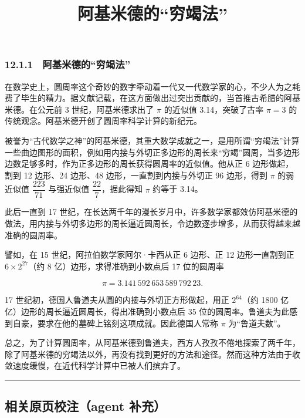 \documentclass[
  10pt,
  fontset=fandol]{ctexart}
\title{阿基米德的``穷竭法''}
\author{}
\date{}
\begin{document}
\maketitle

\subsubsection{12.1.1　阿基米德的``穷竭法''}\label{ux963fux57faux7c73ux5fb7ux7684ux7a77ux7aedux6cd5}

在数学史上，圆周率这个奇妙的数字牵动着一代又一代数学家的心，不少人为之耗费了毕生的精力。据文献记载，在这方面做出过突出贡献的，当首推古希腊的阿基米德。在公元前 3 世纪，阿基米德求出了 \(\pi\) 的近似值 3.14，突破了古率 \(\pi=3\) 的传统观念。阿基米德开创了圆周率科学计算的新纪元。

被誉为``古代数学之神''的阿基米德，其重大数学成就之一，是用所谓``穷竭法''计算一些曲边图形的面积，例如用内接与外切正多边形的周长来``穷竭''圆周，当多边形边数足够多时，作为正多边形的周长获得圆周率的近似值。他从正 6 边形做起，割到 12 边形、24 边形、48 边形，一直割到内接与外切正 96 边形，得到 \(\pi\) 的弱近似值 \(\dfrac{223}{71}\) 与强近似值 \(\dfrac{22}{7}\)，据此得知 \(\pi\) 约等于 3.14。

此后一直到 17 世纪，在长达两千年的漫长岁月中，许多数学家都效仿阿基米德的做法，用内接与外切多边形的周长逼近圆周长，令边数逐步增多，从而获得越来越准确的圆周率。

譬如，在 15 世纪，阿拉伯数学家阿尔·卡西从正 6 边形、正 12 边形一直割到正 \(6\times2^{27}\)（约 8 亿）边形，求得准确到小数点后 17 位的圆周率

\[
\pi=3.141\,592\,653\,589\,792\,23.
\]

17 世纪初，德国人鲁道夫从圆的内接与外切正方形做起，用正 \(2^{64}\)（约 1800 亿亿）边形的周长逼近圆周长，得出准确到小数点后 35 位的圆周率。鲁道夫为此感到自豪，要求在他的墓碑上铭刻这项成就。因此德国人常称 \(\pi\) 为``鲁道夫数''。

总之，为了计算圆周率，从阿基米德到鲁道夫，西方人孜孜不倦地探索了两千年，除了阿基米德的穷竭法以外，再没有找到更好的方法和途径。然而这种方法由于收敛速度缓慢，在近代科学计算中已被人们摈弃了。

\begin{center}\rule{0.5\linewidth}{0.5pt}\end{center}

\subsection{相关原页校注（agent 补充）}\label{ux76f8ux5173ux539fux9875ux6821ux6ce8agent-ux8865ux5145}
\end{document}
